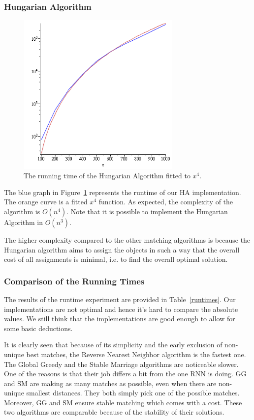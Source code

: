 \documentclass[a4paper,11pt]{article}
\begin{document}
\subsubsection{Hungarian Algorithm}

\begin{figure}[ht!]
\centering 
\includegraphics[width=80mm]{HA_runtime.png}
\caption{The running time of the Hungarian Algorithm fitted to $x^4$.}
\label{hung} 
\end{figure}

The blue graph in Figure~\ref{hung} represents the runtime of our HA implementation. The orange curve is a fitted $x^4$ function. As expected, the complexity of the algorithm is $O(n^{4})$. Note that it is possible to implement the Hungarian Algorithm in $O(n^{3})$.

The higher complexity compared to the other matching algorithms is because the Hungarian algorithm aims to assign the objects in such a way that the overall cost of all assignments is minimal, i.e. to find the overall optimal solution.

\subsubsection{Comparison of the Running Times}
The results of the runtime experiment are provided in Table~\ref{runtimes}. Our implementations are not optimal and hence it's hard to compare the absolute values. We still think that the implementations are good enough to allow for some basic deductions.


It is clearly seen that because of its simplicity and the early exclusion of non-unique best matches, the Reverse Nearest Neighbor algorithm is the fastest one. The Global Greedy and the Stable Marriage algorithms are noticeable slower. One of the reasons is that their job differs a bit from the one RNN is doing. GG and SM are making as many matches as possible, even when there are non-unique smallest distances. They both simply pick one of the possible matches. Moreover, GG and SM ensure stable matching which comes with a cost. These two algorithms are comparable because of the stability of their solutions.
\end{document}
